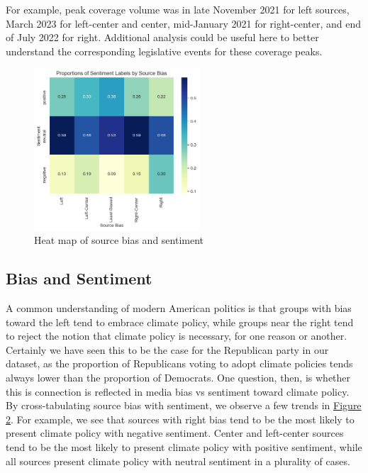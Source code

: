 \documentclass[letterpaper,11pt]{article}
\begin{document}
For example, peak coverage volume was in late November 2021 for left sources, March 2023 for left-center and center, mid-January 2021 for right-center, and end of July 2022 for right. Additional analysis could be useful here to better understand the corresponding legislative events for these coverage peaks.

\begin{figure}[htbp]
    \centering
    \includegraphics[width=0.55\textwidth]{figs/fig_3.png}
    \caption{Heat map of source bias and sentiment}
    \label{fig:heatmap}
\end{figure}

\subsection{Bias and Sentiment}
A common understanding of modern American politics is that groups with bias toward the left tend to embrace climate policy, while groups near the right tend to reject the notion that climate policy is necessary, for one reason or another. Certainly we have seen this to be the case for the Republican party in our dataset, as the proportion of Republicans voting to adopt climate policies tends always lower than the proportion of Democrats. One question, then, is whether this is connection is reflected in media bias vs sentiment toward climate policy. By cross-tabulating source bias with sentiment, we observe  a few trends in \hyperref[fig:heatmap]{Figure 2}. For example, we see that sources with right bias tend to be the most likely to present climate policy with negative sentiment. Center and left-center sources tend to be the most likely to present climate policy with positive sentiment, while all sources present climate policy with neutral sentiment in a plurality of cases.\\
\end{document}
